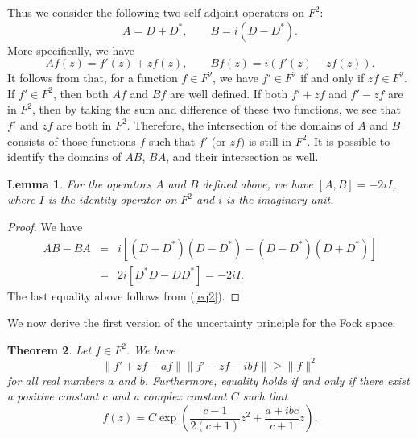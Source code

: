 \documentclass[12pt,reqno]{amsart}
\newtheorem{thm}{Theorem}
\newtheorem{lemma}[thm]{Lemma}
\begin{document}
Thus we consider the following two self-adjoint operators on $F^2$:
$$A=D+D^*,\qquad B=i(D-D^*).$$
More specifically, we have
\begin{equation}
Af(z)=f'(z)+zf(z),\qquad Bf(z)=i(f'(z)-zf(z)).
\label{eq3}
\end{equation}
It follows from \cite{CZ} that, for a function $f\in F^2$, we have $f'\in F^2$ if and only if $zf\in F^2$.
If $f'\in F^2$, then both $Af$ and $Bf$ are well defined. If both $f'+zf$ and $f'-zf$ are in $F^2$,
then by taking the sum and difference of these two functions, we see that $f'$ and $zf$ are both
in $F^2$. Therefore, the intersection of the domains of $A$ and $B$ consists of those functions
$f$ such that $f'$ (or $zf$) is still in $F^2$. It is possible to identify the domains of $AB$, $BA$, and
their intersection as well.

\begin{lemma}
For the operators $A$ and $B$ defined above, we have $[A,B]=-2iI$, where $I$ is the identity
operator on $F^2$ and $i$ is the imaginary unit.
\label{3}
\end{lemma}

\begin{proof}
We have
\begin{eqnarray*}
AB-BA&=&i\left[(D+D^*)(D-D^*)-(D-D^*)(D+D^*)\right]\\
&=&2i[D^*D-DD^*]=-2iI.
\end{eqnarray*}
The last equality above follows from (\ref{eq2}).
\end{proof}

We now derive the first version of the uncertainty principle for the Fock space.

\begin{thm}
Let $f\in F^2$. We have
\begin{equation}
\|f'+zf-af\|\|f'-zf-ibf\|\ge\|f\|^2
\label{eq4}
\end{equation}
for all real numbers $a$ and $b$. Furthermore, equality holds if and only if there exist a positive constant $c$
and a complex constant $C$ such that
$$f(z)=C\exp\left(\frac{c-1}{2(c+1)}z^2+\frac{a+ibc}{c+1}z\right).$$
\label{4}
\end{thm}
\end{document}
